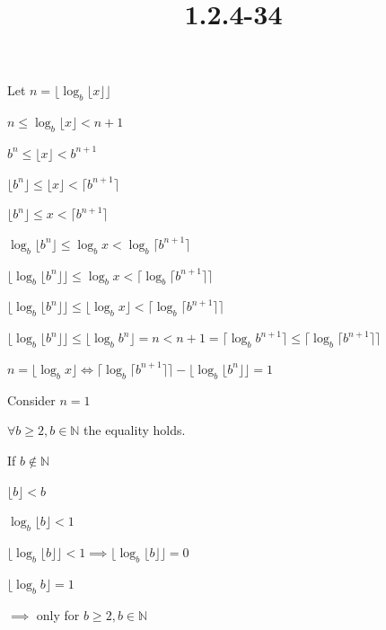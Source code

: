 \documentclass{article}
\title{1.2.4-34}
\begin{document}
\maketitle

Let $n = \lfloor \log_b{\lfloor x \rfloor}\rfloor$

$n \leq \log_b{\lfloor x \rfloor} < n + 1$

$b^n \leq \lfloor x \rfloor < b^{n+1}$

$\lfloor b^n \rfloor \leq \lfloor x \rfloor < \lceil b^{n+1} \rceil$

$\lfloor b^n \rfloor \leq x < \lceil b^{n+1} \rceil$

$\log_b \lfloor b^n \rfloor \leq \log_b{x} < \log_b\lceil b^{n+1} \rceil$

$\lfloor \log_b \lfloor b^n \rfloor \rfloor \leq \log_b{x} < \lceil \log_b\lceil b^{n+1} \rceil \rceil$

$\lfloor \log_b \lfloor b^n \rfloor \rfloor \leq \lfloor \log_b{x} \rfloor < \lceil \log_b\lceil b^{n+1} \rceil \rceil$

$\lfloor \log_b \lfloor b^n \rfloor \rfloor \leq \lfloor \log_b  b^n \rfloor = n < n + 1 = \lceil \log_b b^{n+1} \rceil \leq \lceil \log_b\lceil b^{n+1} \rceil \rceil$

$n = \lfloor \log_b{x} \rfloor \iff \lceil \log_b\lceil b^{n+1} \rceil \rceil -\lfloor \log_b \lfloor b^n \rfloor \rfloor = 1$

Consider $n = 1$

$\forall b \geq 2, b \in \mathbb{N}$ the equality holds.

If $b \notin \mathbb{N}$

$\lfloor b \rfloor < b$

$\log_b{\lfloor b \rfloor} < 1$

$\lfloor\log_b{\lfloor b \rfloor}\rfloor < 1 \implies \lfloor\log_b{\lfloor b \rfloor}\rfloor = 0$

$\lfloor \log_b b \rfloor = 1$

$\implies$ only for $b \geq 2, b \in \mathbb{N}$
\end{document}
